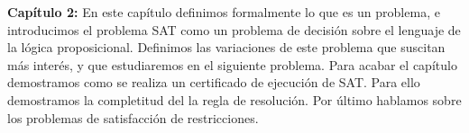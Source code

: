 \textbf{Capítulo 2:} En este capítulo definimos formalmente lo que es un problema, e introducimos el problema SAT como un problema de decisión sobre el lenguaje de la lógica proposicional. Definimos las variaciones de este problema que suscitan más interés, y que estudiaremos en el siguiente problema. Para acabar el capítulo demostramos como se realiza un certificado de ejecución de SAT. Para ello demostramos la completitud del la regla de resolución. Por último hablamos sobre los problemas de satisfacción de restricciones.\\





\endinput
